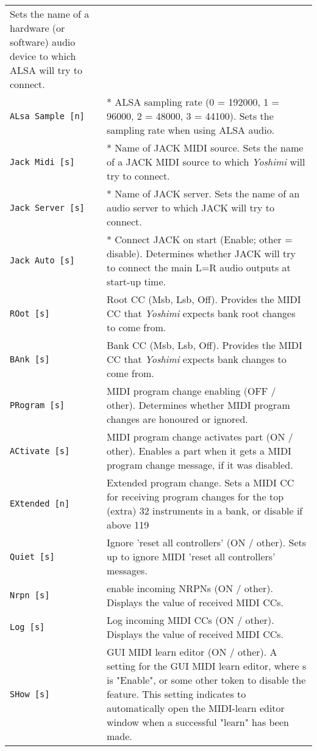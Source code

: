 \begin{center}
\begin{longtable}{p{4cm} p{10cm}}
   Sets the name of a hardware (or software)
   audio device to which ALSA will try to connect.  \\
\texttt{ALsa Sample [n]} &
   * ALSA sampling rate (0 = 192000, 1 = 96000, 2 = 48000, 3 = 44100).
   Sets the sampling rate when using ALSA audio. \\
\texttt{Jack Midi [s]} &
   * Name of JACK MIDI source.
   Sets the name of a JACK MIDI source to which
   \textsl{Yoshimi} will try to connect.  \\
\texttt{Jack Server [s]} &
   * Name of JACK server.
   Sets the name of an audio server to which JACK will try to connect. \\
\texttt{Jack Auto [s]} &
   * Connect JACK on start (Enable; other = disable).
   Determines whether JACK will try to connect the main L=R audio outputs at
   start-up time. \\
\texttt{ROot [s]} &
   Root CC (Msb, Lsb, Off).
   Provides the MIDI CC that \textsl{Yoshimi} expects bank root changes to
   come from.  \\
\texttt{BAnk [s]} &
   Bank CC (Msb, Lsb, Off).
   Provides the MIDI CC that \textsl{Yoshimi} expects
   bank changes to come from.  \\
\texttt{PRogram [s]} &
   MIDI program change enabling (OFF / other).
   Determines whether MIDI program changes are honoured or ignored.  \\
\texttt{ACtivate [s]} &
   MIDI program change activates part (ON / other).
   Enables a part when it gets a MIDI program change message,
   if it was disabled.  \\
\texttt{EXtended [n]} &
   Extended program change.
   Sets a MIDI CC for receiving program changes for the top (extra)
   32 instruments in a bank, or disable if above 119  \\
\texttt{Quiet [s]} &
   Ignore 'reset all controllers' (ON / other).
   Sets up to ignore MIDI 'reset all controllers' messages. \\
\texttt{Nrpn [s]} &
   enable incoming NRPNs (ON / other).
   Displays the value of received MIDI CCs. \\
\texttt{Log [s]} &
   Log incoming MIDI CCs (ON / other).
   Displays the value of received MIDI CCs. \\
\texttt{SHow [s]} &
   GUI MIDI learn editor (ON / other).
   A setting for the GUI MIDI learn editor, where s is "Enable", or some
   other token to disable the feature.
   This setting indicates to automatically open the MIDI-learn editor window
   when a successful "learn" has been made.  \\

\end{longtable}
\end{center}

